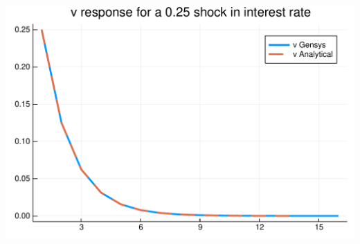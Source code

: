 \documentclass[12pt,a4paper]{article}
\begin{document}
\includegraphics[width=\linewidth]{figures/gensys_23_1.pdf}
\end{document}
